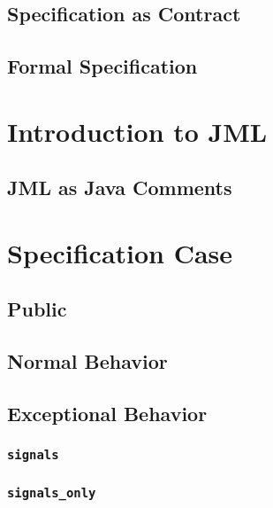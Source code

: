 \documentclass[a4paper, 11pt, accentcolor = tud3b]{tudreport}
\begin{document}
			\subsection{Specification as Contract} %

			\subsection{Formal Specification} %

		\section{Introduction to JML} %

			\subsection{JML as Java Comments} %

		\section{Specification Case} %

			\subsection{Public} %

			\subsection{Normal Behavior} %

			\subsection{Exceptional Behavior} %

				\subsubsection{\texttt{signals}} %

				\subsubsection{\texttt{signals\_only} } %
\end{document}

